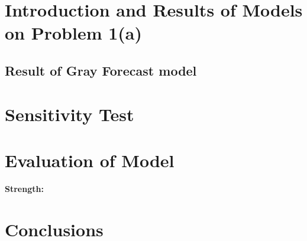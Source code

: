 \documentclass{mcmthesis}
\numberwithin{figure}{section}
\numberwithin{table}{section}
\numberwithin{equation}{section}
\begin{document}
\section{Introduction and Results of Models on Problem 1(a)}


\subsection{Result of Gray Forecast model}


\section{Sensitivity Test}

\section{Evaluation of Model}

\textbf{Strength:}


\section{Conclusions}



\newpage
{}
\memodate{\today}

\begin{memo}

  
\end{memo}




\newpage






\lhead{\small\sffamily \team}

\begin{appendices}

% 


% 
% 
% 
% 
% 

\end{appendices}
\end{document}
